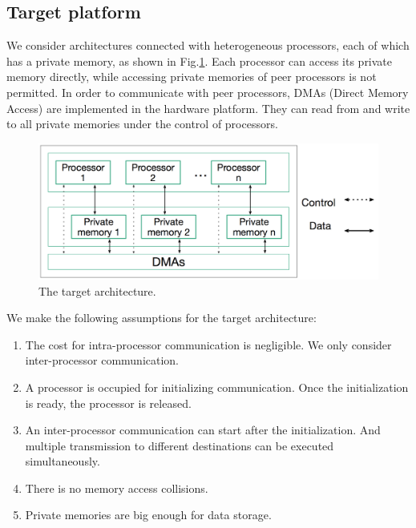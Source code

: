 \subsection{Target platform}
We consider architectures connected with heterogeneous processors, each of which has a private memory, as shown in Fig.\ref{fig:platform}. Each processor can access its private memory directly, while accessing private memories of peer processors is not permitted. In order to communicate with peer processors, DMAs (Direct Memory Access) are implemented in the hardware platform. They can read from and write to all private memories under the control of processors. %
\begin{figure}
\centering
 \includegraphics[width=0.8\columnwidth]{figures/platform.png}
  \caption{The target architecture.}
 \label{fig:platform}
 \vspace{-7.5mm}
 \end{figure}
We make the following assumptions for the target architecture:
\begin{enumerate}
\item The cost for intra-processor communication is negligible. We only consider inter-processor communication.
\item A processor is occupied for initializing communication. Once the initialization is ready, the processor is released.
\item An inter-processor communication can start after the initialization. And multiple transmission to different destinations can be executed simultaneously. 
\item There is no memory access collisions.
\item Private memories are big enough for data storage.
\end{enumerate}

